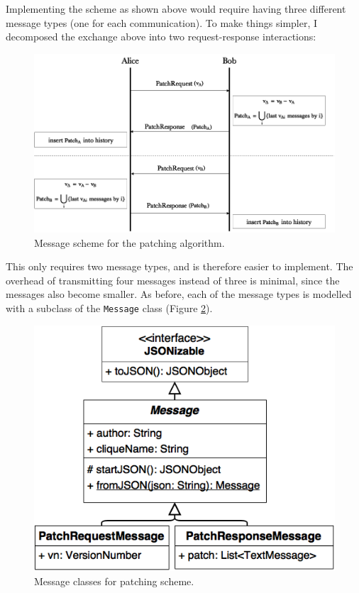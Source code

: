 \documentclass[a4paper, twoside, 12pt]{report}
\begin{document}
Implementing the scheme as shown above would require having three different message types (one for each communication). To make things simpler, I decomposed the exchange above into two request-response interactions:

\begin{figure}[H]
    \captionsetup{width=0.76\textwidth}
    \centering
    \includegraphics[width=0.8\linewidth]{pics/patching_modified.png}
    \caption{\label{fig:patching_modified} Message scheme for the patching algorithm.}
\end{figure}

This only requires two message types, and is therefore easier to implement. The overhead of transmitting four messages instead of three is minimal, since the messages also become smaller. As before, each of the message types is modelled with a subclass of the \texttt{Message} class (Figure \ref{fig:patching_messages_uml}).

\begin{figure}[H]
    \captionsetup{width=0.76\textwidth}
    \centering
    \includegraphics[width=0.6\linewidth]{pics/patching_messages_uml.png}
    \caption{\label{fig:patching_messages_uml} Message classes for patching scheme. }
\end{figure}
\end{document}
